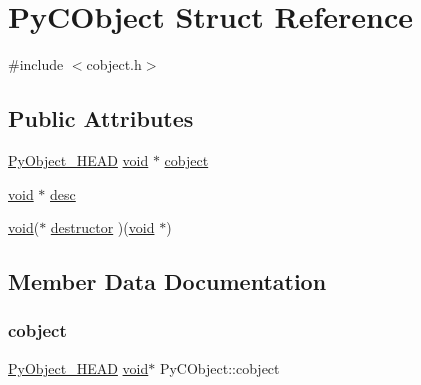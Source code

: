 \hypertarget{struct_py_c_object}{}\section{Py\+C\+Object Struct Reference}
\label{struct_py_c_object}


{\ttfamily \#include $<$cobject.\+h$>$}

\subsection*{Public Attributes}
\begin{DoxyCompactItemize}
\item 
\mbox{\hyperlink{_python27_2object_8h_a0bf35c1f3ea13f925de94d8593db3b7e}{Py\+Object\+\_\+\+H\+E\+AD}} \mbox{\hyperlink{_s_d_l__opengles2__gl2ext_8h_ae5d8fa23ad07c48bb609509eae494c95}{void}} $\ast$ \mbox{\hyperlink{struct_py_c_object_a7b34055a66089138a3b0a521693f213f}{cobject}}
\item 
\mbox{\hyperlink{_s_d_l__opengles2__gl2ext_8h_ae5d8fa23ad07c48bb609509eae494c95}{void}} $\ast$ \mbox{\hyperlink{struct_py_c_object_a4fe770b568a3b1535e65e6628fc3b6ba}{desc}}
\item 
\mbox{\hyperlink{_s_d_l__opengles2__gl2ext_8h_ae5d8fa23ad07c48bb609509eae494c95}{void}}($\ast$ \mbox{\hyperlink{struct_py_c_object_aabeacd210067fddb5b0d328269326d0d}{destructor}} )(\mbox{\hyperlink{_s_d_l__opengles2__gl2ext_8h_ae5d8fa23ad07c48bb609509eae494c95}{void}} $\ast$)
\end{DoxyCompactItemize}


\subsection{Member Data Documentation}
\mbox{\label{struct_py_c_object_a7b34055a66089138a3b0a521693f213f}} 
\subsubsection{\texorpdfstring{cobject}{cobject}}
{\footnotesize\ttfamily \mbox{\hyperlink{_python27_2object_8h_a0bf35c1f3ea13f925de94d8593db3b7e}{Py\+Object\+\_\+\+H\+E\+AD}} \mbox{\hyperlink{_s_d_l__opengles2__gl2ext_8h_ae5d8fa23ad07c48bb609509eae494c95}{void}}$\ast$ Py\+C\+Object\+::cobject}

\mbox{\label{struct_py_c_object_a4fe770b568a3b1535e65e6628fc3b6ba}} 
